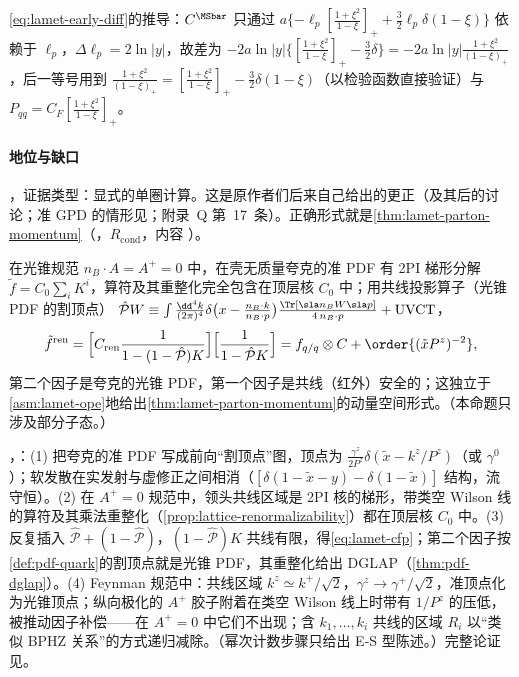 \cref{eq:lamet-early-diff}的推导：$C^{\MSbar}$ 只通过 $a\{-\ell_p[\frac{1+\xi^2}{1-\xi}]_++\frac32\ell_p\delta(1-\xi)\}$ 依赖于 $\ell_p$，$\Delta\ell_p=2\ln|y|$，故差为 $-2a\ln|y|\{[\frac{1+\xi^2}{1-\xi}]_+-\frac32\delta\}=-2a\ln|y|\frac{1+\xi^2}{(1-\xi)_+}$，后一等号用到 $\frac{1+\xi^2}{(1-\xi)_+}=[\frac{1+\xi^2}{1-\xi}]_+-\frac32\delta(1-\xi)$（以检验函数直接验证）与 $P_{qq}=C_F[\frac{1+\xi^2}{1-\xi}]_+$。

\paragraph{地位与缺口}
\tagV，证据类型：显式的单圈计算\cite{IzubuchiEtAl2018}。这是原作者们后来自己给出的更正（\cite[式~(27)]{IzubuchiEtAl2018}及其后的讨论；准 GPD 的情形见\cite{Ji:2015qla}；附录~Q 第~17~条）。正确形式就是\cref{thm:lamet-parton-momentum}（\tagR，$R_{\mathrm{cond}}$，内容 \tagA）。

\begin{proposition}\label{prop:lamet-cfp}
在光锥规范 $n_B\cdot A=A^+=0$ 中，在壳无质量夸克的准 PDF 有 2PI 梯形分解 $\tilde f=C_0\sum_iK^i$，算符及其重整化完全包含在顶层核 $C_0$ 中；用共线投影算子（光锥 PDF 的割顶点）
$\hat{\mathcal P}W\equiv\int\frac{\dd^4k}{(2\pi)^4}\delta\big(x-\frac{n_B\cdot k}{n_B\cdot p}\big)\frac{\Tr[\sla n_BW\sla p]}{4\,n_B\cdot p}+\text{UVCT}$，
\begin{equation}\label{eq:lamet-cfp}
\tilde f^{\rm ren}=\Big[C_{\rm ren}\frac1{1-(1-\hat{\mathcal P})K}\Big]\Big[\frac1{1-\hat{\mathcal P}K}\Big]=f_{q/q}\otimes C+\order{(\tilde xP^z)^{-2}},
\end{equation}
第二个因子是夸克的光锥 PDF，第一个因子是共线（红外）安全的；这独立于\cref{asm:lamet-ope}地给出\cref{thm:lamet-parton-momentum}的动量空间形式。（本命题只涉及部分子态。）
\end{proposition}

\begin{proofsketch}
\cite{Ma:2014jla}，\cite[第~III.B~节]{JiEtAl2021}：(1) 把夸克的准 PDF 写成前向“割顶点”图，顶点为 $\frac{\gamma^z}{2P^z}\delta(\tilde x-k^z/P^z)$（或 $\gamma^0$）；软发散在实发射与虚修正之间相消（$[\delta(1-\tilde x-y)-\delta(1-\tilde x)]$ 结构，流守恒）。(2) 在 $A^+=0$ 规范中，领头共线区域是 2PI 核的梯形\cite{EllisEtAl1979,CurciFurmanskiPetronzio1980}，带类空 Wilson 线的算符及其乘法重整化（\cref{prop:lattice-renormalizability}）都在顶层核 $C_0$ 中。(3) 反复插入 $\hat{\mathcal P}+(1-\hat{\mathcal P})$，$(1-\hat{\mathcal P})K$ 共线有限，得\cref{eq:lamet-cfp}；第二个因子按\cref{def:pdf-quark}的割顶点就是光锥 PDF，其重整化给出 DGLAP（\cref{thm:pdf-dglap}）。(4) Feynman 规范中：共线区域 $k^z\simeq k^+/\sqrt2$，$\gamma^z\to\gamma^+/\sqrt2$，准顶点化为光锥顶点；纵向极化的 $A^+$ 胶子附着在类空 Wilson 线上时带有 $1/P^z$ 的压低，被推动因子补偿——在 $A^+=0$ 中它们不出现；含 $k_1,\dots,k_i$ 共线的区域 $R_i$ 以“类似 BPHZ 关系”的方式递归减除\cite[第~III.B~节]{JiEtAl2021}。（幂次计数步骤只给出 E-S 型陈述。）完整论证见\cite{Ma:2014jla}。
\end{proofsketch}

